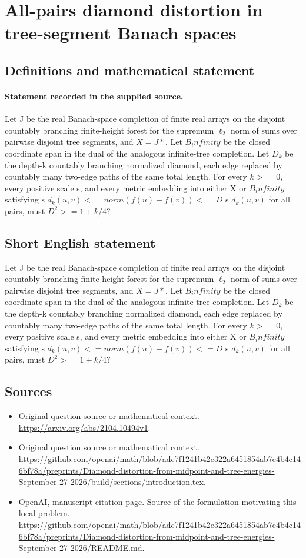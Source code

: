 \documentclass[11pt]{article}
\begin{document}
\section*{All-pairs diamond distortion in tree-segment Banach spaces}\label{statement}
\subsection{Definitions and mathematical statement}
\paragraph{Statement recorded in the supplied source.}
Let J be the real Banach-space completion of finite real arrays on the disjoint countably branching finite-height forest for the supremum $\ell _2$ norm of sums over pairwise disjoint tree segments, and $X=J*$. Let $B_infinity$ be the closed coordinate span in the dual of the analogous infinite-tree completion. Let $D_k$ be the depth-k countably branching normalized diamond, each edge replaced by countably many two-edge paths of the same total length. For every $k>=0$, every positive scale s, and every metric embedding into either X or $B_infinity$ satisfying s $d_k(u,v)<=norm(f(u)-f(v))<=D$ s $d_k(u,v)$ for all pairs, must $D^2>=1+k/4$?
\subsection{Short English statement}
Let J be the real Banach-space completion of finite real arrays on the disjoint countably branching finite-height forest for the supremum $\ell _2$ norm of sums over pairwise disjoint tree segments, and $X=J*$. Let $B_infinity$ be the closed coordinate span in the dual of the analogous infinite-tree completion. Let $D_k$ be the depth-k countably branching normalized diamond, each edge replaced by countably many two-edge paths of the same total length. For every $k>=0$, every positive scale s, and every metric embedding into either X or $B_infinity$ satisfying s $d_k(u,v)<=norm(f(u)-f(v))<=D$ s $d_k(u,v)$ for all pairs, must $D^2>=1+k/4$?
\subsection{Sources}
\begin{itemize}
\item[S1] Original question source or mathematical context.
\url{https://arxiv.org/abs/2104.10494v1}.
\item[S2] Original question source or mathematical context.
\url{https://github.com/openai/math/blob/adc7f1241b42e322a6451854ab7e4b4c146bf78a/preprints/Diamond-distortion-from-midpoint-and-tree-energies-September-27-2026/build/sections/introduction.tex}.
\item[S3] OpenAI, manuscript citation page. Source of the formulation motivating this local problem.
\url{https://github.com/openai/math/blob/adc7f1241b42e322a6451854ab7e4b4c146bf78a/preprints/Diamond-distortion-from-midpoint-and-tree-energies-September-27-2026/README.md}.
\end{itemize}
\end{document}
